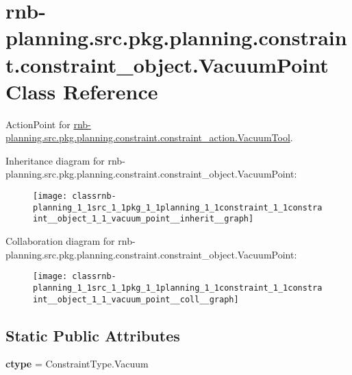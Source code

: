 \hypertarget{classrnb-planning_1_1src_1_1pkg_1_1planning_1_1constraint_1_1constraint__object_1_1_vacuum_point}{}\section{rnb-\/planning.src.\+pkg.\+planning.\+constraint.\+constraint\+\_\+object.\+Vacuum\+Point Class Reference}
\label{classrnb-planning_1_1src_1_1pkg_1_1planning_1_1constraint_1_1constraint__object_1_1_vacuum_point}


Action\+Point for \hyperlink{classrnb-planning_1_1src_1_1pkg_1_1planning_1_1constraint_1_1constraint__action_1_1_vacuum_tool}{rnb-\/planning.\+src.\+pkg.\+planning.\+constraint.\+constraint\+\_\+action.\+Vacuum\+Tool}.  




Inheritance diagram for rnb-\/planning.src.\+pkg.\+planning.\+constraint.\+constraint\+\_\+object.\+Vacuum\+Point\+:\nopagebreak
\begin{figure}[H]
\begin{center}
\leavevmode
\texttt{[image: classrnb-planning\_1\_1src\_1\_1pkg\_1\_1planning\_1\_1constraint\_1\_1constraint\_\_object\_1\_1\_vacuum\_point\_\_inherit\_\_graph]}
\end{center}
\end{figure}


Collaboration diagram for rnb-\/planning.src.\+pkg.\+planning.\+constraint.\+constraint\+\_\+object.\+Vacuum\+Point\+:\nopagebreak
\begin{figure}[H]
\begin{center}
\leavevmode
\texttt{[image: classrnb-planning\_1\_1src\_1\_1pkg\_1\_1planning\_1\_1constraint\_1\_1constraint\_\_object\_1\_1\_vacuum\_point\_\_coll\_\_graph]}
\end{center}
\end{figure}
\subsection*{Static Public Attributes}
\begin{DoxyCompactItemize}
\item 
\mbox{\label{classrnb-planning_1_1src_1_1pkg_1_1planning_1_1constraint_1_1constraint__object_1_1_vacuum_point_a1e5de0e638c0488177b11150fb0a3e0f}} 
{\bfseries ctype} = Constraint\+Type.\+Vacuum
\end{DoxyCompactItemize}
